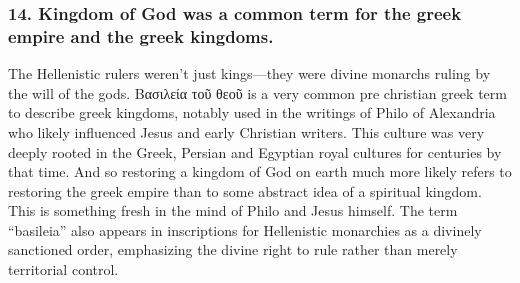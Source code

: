 \subsubsection{14.
Kingdom of God was a common term for the greek empire and the greek kingdoms.}\label{subsubsec:kingdom-of-god-was-a-common-term-for-the-greek-empire-and-the-greek-kingdoms.}
The Hellenistic rulers weren’t just kings—they were divine monarchs ruling by the will of the gods.
Βασιλεία τοῦ θεοῦ is a very common pre christian greek term to describe greek kingdoms, notably used in the writings of Philo of Alexandria who likely influenced Jesus and early Christian writers.
This culture was very deeply rooted in the Greek, Persian and Egyptian royal cultures for centuries by that time.
And so restoring a kingdom of God on earth much more likely refers to restoring the greek empire than to some abstract idea of a spiritual kingdom.
This is something fresh in the mind of Philo and Jesus himself.
The term “basileia” also appears in inscriptions for Hellenistic monarchies as a divinely sanctioned order, emphasizing the divine right to rule rather than merely territorial control.

